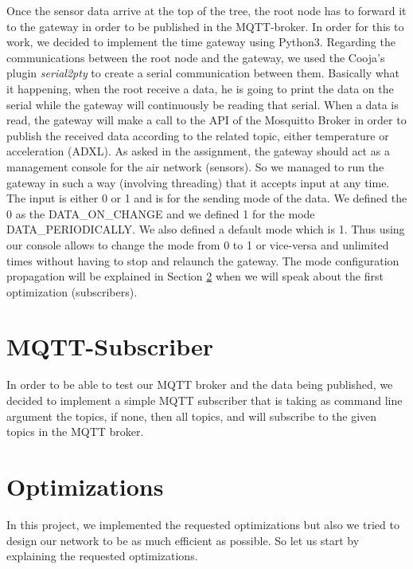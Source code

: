 \documentclass[a4paper,10pt]{article}
\begin{document}
Once the sensor data arrive at the top of the tree, the root node has to forward it to the gateway in order to be published in the MQTT-broker. In order for this to work, we decided to implement the time gateway using Python3. Regarding the communications between the root node and the gateway, we used the Cooja's plugin \emph{serial2pty} to create a serial communication between them. Basically what it happening, when the root receive a data, he is going to print the data on the serial while the gateway will continuously be reading that serial. When a data is read, the gateway will make a call to the API of the Mosquitto Broker in order to publish the received data according to the related topic, either temperature or acceleration (ADXL). As asked in the assignment, the gateway should act as a management console for the air network (sensors). So we managed to run the gateway in such a way (involving threading) that it accepts input at any time. The input is either 0 or 1 and is for the sending mode of the data. We defined the 0 as the DATA\_ON\_CHANGE and we defined 1 for the mode DATA\_PERIODICALLY. We also defined a default mode which is 1. Thus using our console allows to change the mode from 0 to 1 or vice-versa and unlimited times without having to stop and relaunch the gateway. The mode configuration propagation will be explained in Section \ref{opti} when we will speak about the first optimization (subscribers).


\section{MQTT-Subscriber}
\label{subscriber}
In order to be able to test our MQTT broker and the data being published, we decided to implement a simple MQTT subscriber that is taking as command line argument the topics, if none, then all topics, and will subscribe to the given topics in the MQTT broker.


\section{Optimizations}
\label{opti}
In this project, we implemented the requested optimizations but also we tried to design our network to be as much efficient as possible.  So let us start by explaining the requested optimizations.
\end{document}
